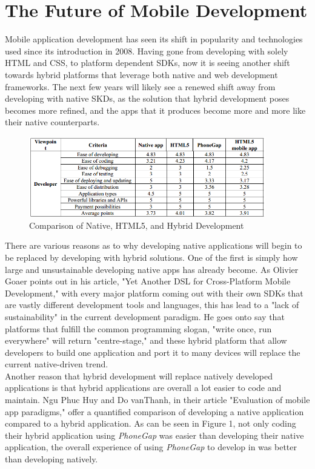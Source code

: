 \documentclass[11pt, twocolumn]{article}
\begin{document}
\section{The Future of Mobile Development}
Mobile application development has seen its shift in popularity and technologies used since its introduction in 2008. Having gone from developing with solely HTML and CSS, to platform dependent SDKs, now it is seeing another shift towards hybrid platforms that leverage both native and web development frameworks.  The next few years will likely see a renewed shift away from developing with native SKDs, as the solution that hybrid development poses becomes more refined, and the apps that it produces become more and more like their native counterparts.\\

\begin{figure}[ht]
\includegraphics[width=\textwidth, height=3.5cm]{hybrid-native-compare-table}
\caption{Comparison of Native, HTML5, and Hybrid Development ~\cite{Huy2012}}
\end{figure}

There are various reasons as to why developing native applications will begin to be replaced by developing with hybrid solutions.  One of the first is simply how large and unsustainable developing native apps has already become.  As Olivier Goaer points out in his article, "Yet Another DSL for Cross-Platform Mobile Development," with every major platform coming out with their own SDKs that are vastly different development tools and languages, this has lead to a "lack of sustainability" in the current development paradigm.  He goes onto say that platforms that fulfill the common programming slogan, "write once, run everywhere" will return "centre-stage," and these hybrid platform that allow developers to build one application and port it to many devices will replace the current native-driven trend. ~\cite{Goaer2013}\\

Another reason that hybrid development will replace natively developed applications is that hybrid applications are overall a lot easier to code and maintain.  Ngu Phuc Huy and Do vanThanh, in their article "Evaluation of mobile app paradigms," offer a quantified comparison of developing a native application compared to a hybrid application.  As can be seen in Figure 1, not only coding their hybrid application using {\it PhoneGap} was easier than developing their native application, the overall experience of using {\it PhoneGap} to develop in was better than developing natively. ~\cite{Huy2012}\\
\end{document}
